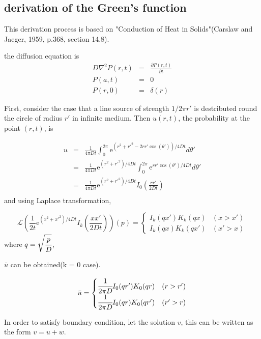 \documentclass{article}
\begin{document}
\subsection{derivation of the Green's function}

This derivation process is based on
"Conduction of Heat in Solids"(Carslaw and Jaeger, 1959, p.368, section 14.8).

the diffusion equation is
\begin{eqnarray}
    D\nabla^2 P(r, t) &=& \frac{\partial P(r,t)}{\partial t} \nonumber \\
    P(a,t) &=& 0 \nonumber \\
    P(r,0) &=& \delta(r)
\end{eqnarray}

First, consider the case that a line source of strength
$1/2\pi r'$ is destributed round the circle of radius $r'$ in infinite medium.
Then $u(r, t)$, the probability at the point $(r, t)$, is

\begin{eqnarray}
  u &=& \frac{1}{4\pi Dt}
    \int^{2\pi}_0 \mathrm{e}^{(r^2+r'^2-2rr'\cos(\theta'))/4Dt} d\theta'
        \nonumber \\
    &=& \frac{1}{4\pi Dt} \mathrm{e}^{(r^2+r'^2)/4Dt}
        \int^{2\pi}_0 \mathrm{e}^{rr'\cos(\theta')/4Dt} d\theta'
        \nonumber \\
    &=& \frac{1}{4\pi Dt} \mathrm{e}^{(r^2+r'^2)/4Dt}
        I_0 \left( \frac{rr'}{2Dt} \right)
        \nonumber \\
\end{eqnarray}
and using Laplace transformation,

\[
    \mathscr{L}\left( \frac{1}{2t}\mathrm{e}^{(x^2+x'^2)/4Dt}
    I_k\left(\frac{xx'}{2Dt}\right) \right) (p)
    = \begin{cases}
          I_k(qx')K_k(qx) & (x > x') \\
          I_k(qx)K_k(qx') & (x' > x)
      \end{cases}
\]
where $q = \sqrt{\cfrac{p}{D}}$,

$\bar{u}$ can be obtained(k = 0 case).

\[
\bar{u} = \begin{cases}
    \cfrac{1}{2 \pi D} I_0(qr')K_0(qr) & (r > r') \\
    \cfrac{1}{2 \pi D} I_0(qr)K_0(qr') & (r' > r)
\end{cases}
\]

In order to satisfy boundary condition, let the solution $v$,
this can be written as the form $v = u + w$.
\end{document}
